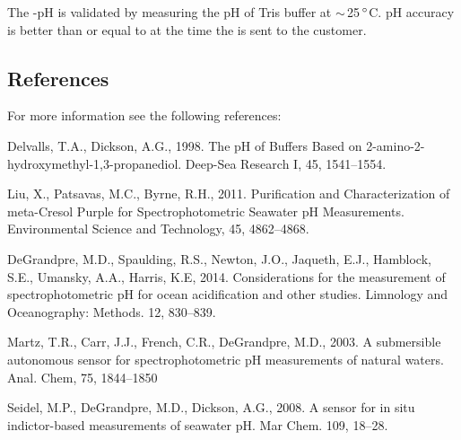 The \instType{}-pH is validated by measuring the pH of Tris buffer at $\sim$\,25\,$\degree$C. pH accuracy is better than or equal to \ifcase {}  \fi at the time the \instType{} is sent to the customer.


\subsection{References}

For more information see the following references:

Delvalls, T.A., Dickson, A.G., 1998.  The pH of Buffers Based on 2-amino-2-hydroxymethyl-1,3-propanediol. Deep-Sea Research I, 45, 1541--1554.

Liu, X., Patsavas, M.C., Byrne, R.H., 2011. Purification and Characterization of meta-Cresol Purple for Spectrophotometric Seawater pH Measurements.  Environmental Science and Technology, 45, 4862--4868.

DeGrandpre, M.D., Spaulding, R.S., Newton, J.O., Jaqueth, E.J., Hamblock, S.E., Umansky, A.A., Harris, K.E, 2014. Considerations for the measurement of spectrophotometric pH for ocean acidification and other studies. Limnology and Oceanography: Methods. 12, 830--839.

Martz, T.R., Carr, J.J., French, C.R., DeGrandpre, M.D., 2003. A submersible autonomous sensor for spectrophotometric pH measurements of natural waters. Anal. Chem, 75, 1844--1850

Seidel, M.P., DeGrandpre, M.D., Dickson, A.G., 2008. A sensor for in situ indictor-based measurements of seawater pH. Mar Chem. 109, 18--28.